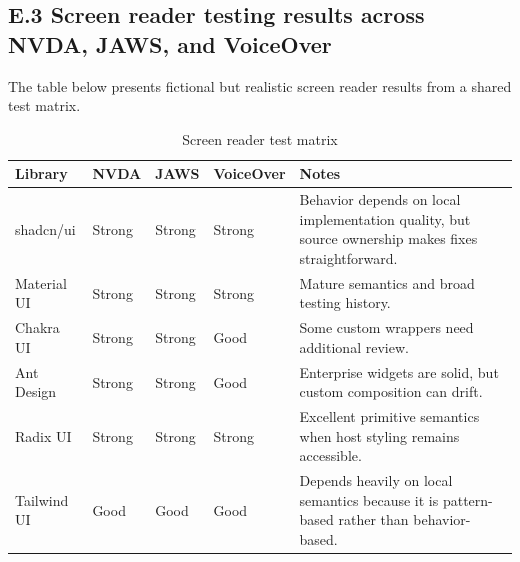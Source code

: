 \subsection*{E.3 Screen reader testing results across NVDA, JAWS, and VoiceOver}
The table below presents fictional but realistic screen reader results from a shared test matrix.

\begin{table}[htbp]
  \centering
  \caption{Screen reader test matrix}\label{tab:sr-matrix}
  \begin{tabularx}{\textwidth}{@{}p{}p{}p{}p{}Y@{}}
    \toprule
    \textbf{Library} & \textbf{NVDA} & \textbf{JAWS} & \textbf{VoiceOver} & \textbf{Notes} \\
    \midrule
    shadcn/ui & Strong & Strong & Strong & Behavior depends on local implementation quality, but source ownership makes fixes straightforward. \\
    Material UI & Strong & Strong & Strong & Mature semantics and broad testing history. \\
    Chakra UI & Strong & Strong & Good & Some custom wrappers need additional review. \\
    Ant Design & Strong & Strong & Good & Enterprise widgets are solid, but custom composition can drift. \\
    Radix UI & Strong & Strong & Strong & Excellent primitive semantics when host styling remains accessible. \\
    Tailwind UI & Good & Good & Good & Depends heavily on local semantics because it is pattern-based rather than behavior-based. \\
    \bottomrule
  \end{tabularx}
\end{table}


